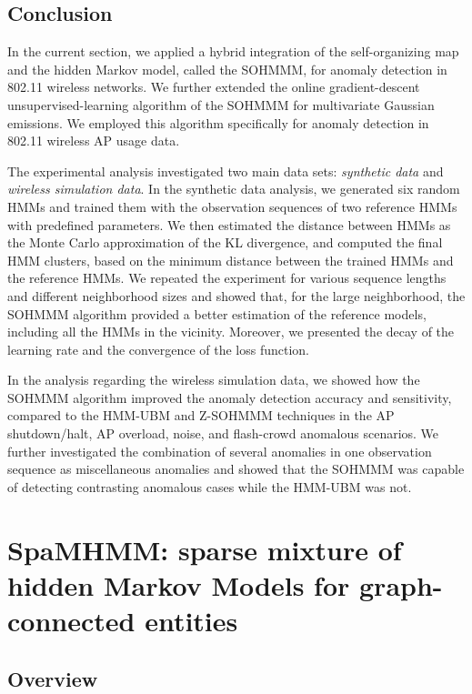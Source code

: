 \subsection{Conclusion}
\label{sec:sohmmm_conclusion}

In the current section, we applied a hybrid integration of the self-organizing map and the hidden Markov model, called the SOHMMM, for anomaly detection in 802.11 wireless networks. We further extended the online gradient-descent unsupervised-learning algorithm of the SOHMMM for multivariate Gaussian emissions. We employed this algorithm specifically for anomaly detection in 802.11 wireless AP usage data.

The experimental analysis investigated two main data sets: \textit{synthetic data} and \textit{wireless simulation data}. In the synthetic data analysis, we generated six random HMMs and trained them with the observation sequences of two reference HMMs with predefined parameters. We then estimated the distance between HMMs as the Monte Carlo approximation of the KL divergence, and computed the final HMM clusters, based on the minimum distance between the trained HMMs and the reference HMMs. We repeated the experiment for various sequence lengths and different neighborhood sizes and showed that, for the large neighborhood, the SOHMMM algorithm provided a better estimation of the reference models, including all the HMMs in the vicinity. Moreover, we presented the decay of the learning rate and the convergence of the loss function.

In the analysis regarding the wireless simulation data, we showed how the SOHMMM algorithm improved the anomaly detection accuracy and sensitivity, compared to the HMM-UBM and Z-SOHMMM techniques in the AP shutdown/halt, AP overload, noise, and flash-crowd anomalous scenarios. We further investigated the combination of several anomalies in one observation sequence as miscellaneous anomalies and showed that the SOHMMM was capable of detecting contrasting anomalous cases while the HMM-UBM was not.

\section{SpaMHMM: sparse mixture of hidden Markov Models for graph-connected entities}
\label{sec:spamhmm}

\subsection{Overview}

